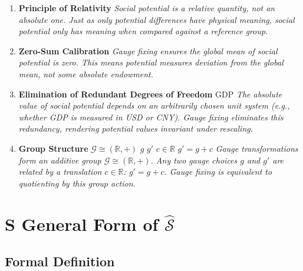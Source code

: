 \documentclass[11pt,a4paper]{article}
\theoremstyle{definition}
\newcommand{\Sop}{\hat{\mathcal{S}}}
\newcommand{\R}{\mathbb{R}}
\newcommand{\gaugegroup}{\mathcal{G}}
\begin{document}
\begin{enumerate}[leftmargin=*]
    \item \textbf{ Principle of Relativity}\textit{}\textit{}
    \textit{}
    \textit{Social potential is a \textit{relative} quantity, not an \textit{absolute} one. Just as only potential \textit{differences} have physical meaning, social potential only has meaning when compared against a reference group.}
    
    \item \textbf{ Zero-Sum Calibration}
    \textit{}
    \textit{Gauge fixing ensures the global mean of social potential is zero. This means potential measures \textit{deviation} from the global mean, not some absolute endowment.}
    
    \item \textbf{ Elimination of Redundant Degrees of Freedom}
    GDP
    \textit{The absolute value of social potential depends on an arbitrarily chosen unit system (e.g., whether GDP is measured in USD or CNY). Gauge fixing eliminates this redundancy, rendering potential values invariant under rescaling.}
    
    \item \textbf{ Group Structure} $\gaugegroup \cong (\R, +)$
     $g$  $g'$  $c \in \R$ $g' = g + c$
    \textit{Gauge transformations form an additive group $\gaugegroup \cong (\R, +)$. Any two gauge choices $g$ and $g'$ are related by a translation $c \in \R$: $g' = g + c$. Gauge fixing is equivalent to quotienting by this group action.}
\end{enumerate}

\section{S  General Form of $\Sop$}

\subsection{ Formal Definition}
\end{document}
